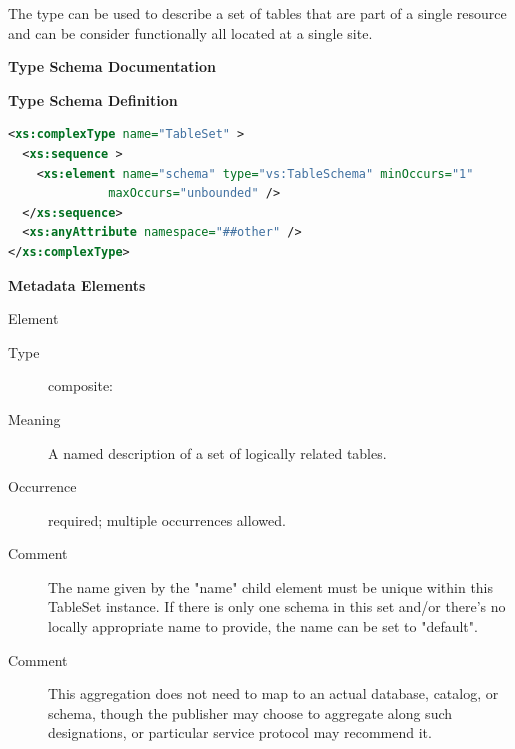 \documentclass[11pt,a4paper]{ivoa}
\begin{document}
The  type can be used
to describe a set of tables that are part of a single resource and can
be consider functionally all located at a single site.



\begin{generated}
\begingroup
      	\renewcommand*\descriptionlabel[1]{%
      	\hbox to 5.5em{\emph{#1}\hfil}}\vspace{2ex}\noindent\textbf{ Type Schema Documentation}


\vspace{1ex}\noindent\textbf{ Type Schema Definition}

\begin{lstlisting}[language=XML,basicstyle=\footnotesize]
<xs:complexType name="TableSet" >
  <xs:sequence >
    <xs:element name="schema" type="vs:TableSchema" minOccurs="1"
              maxOccurs="unbounded" />
  </xs:sequence>
  <xs:anyAttribute namespace="##other" />
</xs:complexType>
\end{lstlisting}

\vspace{0.5ex}\noindent\textbf{ Metadata Elements}

\begingroup\small\begin{bigdescription}\item[Element \xmlel{schema}]
\begin{description}
\item[Type] composite: 
\item[Meaning] 
                A named description of a set of logically related tables.
              
\item[Occurrence] required; multiple occurrences allowed.
\item[Comment] 
                The name given by the {"}name{"} child element must
                be unique within this TableSet instance.  If there is
                only one schema in this set and/or there's no locally
                appropriate name to provide, the name can be set to
                {"}default{"}.  
              
\item[Comment] 
                This aggregation does not need to map to an
                actual database, catalog, or schema, though the
                publisher may choose to aggregate along such
                designations, or particular service protocol may
                recommend it.  
              

\end{description}


\end{bigdescription}\endgroup

\endgroup
\end{generated}
\end{document}
